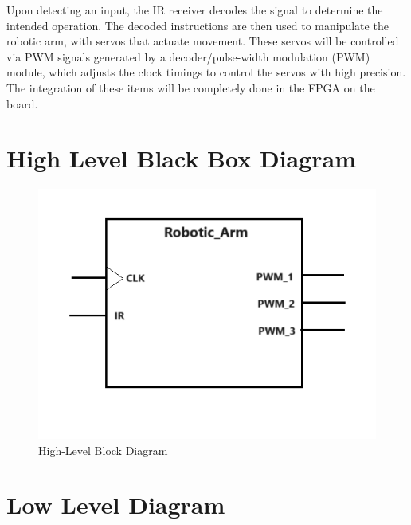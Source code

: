 \documentclass[
    a4paper, %
	12pt, %
    ]{CSSullivanBusinessReport}
\begin{document}
Upon detecting an input, the IR receiver decodes the signal to determine the intended operation. The decoded instructions are then used to manipulate the robotic arm, with servos that actuate movement. These servos will be controlled via PWM signals generated by a decoder/pulse-width modulation (PWM) module, which adjusts the clock timings to control the servos with high precision. The integration of these items will be completely done in the FPGA on the board. 


\section{High Level Black Box Diagram} %

\begin{figure}[h]
    \centering
    \includegraphics[width=.8\textwidth]{Pictures/HLBBD.png}
    \caption[center]{High-Level Block Diagram}
    \label{fig:highlevelblockdiagram}
\end{figure}
\newpage
\section{Low Level Diagram} %
\end{document}
